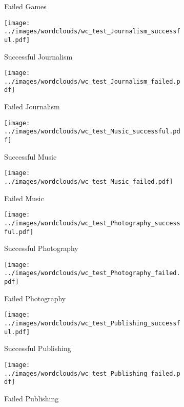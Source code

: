 \documentclass{article}
\begin{document}
\begin{figure}
\begin{subfigure}[i']{0.2\linewidth}
    \caption{Failed Games}
    \label{fig:Games_f_test}
  \end{subfigure}
  \begin{subfigure}[j]{0.2\linewidth}
    \centering\texttt{[image: ../images/wordclouds/wc\_test\_Journalism\_successful.pdf]}
    \caption{Successful Journalism}
    \label{fig:Journalism_s_test}
  \end{subfigure} 
  \begin{subfigure}[j']{0.2\linewidth}
    \centering\texttt{[image: ../images/wordclouds/wc\_test\_Journalism\_failed.pdf]}
    \caption{Failed Journalism}
    \label{fig:Journalism_f_test}
  \end{subfigure}
  \begin{subfigure}[k]{0.2\linewidth}
    \centering\texttt{[image: ../images/wordclouds/wc\_test\_Music\_successful.pdf]}
    \caption{Successful Music}
    \label{fig:Music_s_test}
  \end{subfigure} 
  \begin{subfigure}[k']{0.2\linewidth}
    \centering\texttt{[image: ../images/wordclouds/wc\_test\_Music\_failed.pdf]}
    \caption{Failed Music}
    \label{fig:Music_f_test}
  \end{subfigure}
  \begin{subfigure}[l]{0.2\linewidth}
    \centering\texttt{[image: ../images/wordclouds/wc\_test\_Photography\_successful.pdf]}
    \caption{Successful Photography}
    \label{fig:Photography_s_test}
  \end{subfigure} 
  \begin{subfigure}[l']{0.2\linewidth}
    \centering\texttt{[image: ../images/wordclouds/wc\_test\_Photography\_failed.pdf]}
    \caption{Failed Photography}
    \label{fig:Photography_f_test}
  \end{subfigure}
    \begin{subfigure}[m]{0.2\linewidth}
    \centering\texttt{[image: ../images/wordclouds/wc\_test\_Publishing\_successful.pdf]}
    \caption{Successful Publishing}
    \label{fig:Publishing_s_test}
  \end{subfigure} 
  \begin{subfigure}[m']{0.2\linewidth}
    \centering\texttt{[image: ../images/wordclouds/wc\_test\_Publishing\_failed.pdf]}
    \caption{Failed Publishing}
    \label{fig:Publishing_f_test}
  \end{subfigure}
    \begin{subfigure}[n]{0.2\linewidth}

\end{subfigure}
\end{figure}
\end{document}
